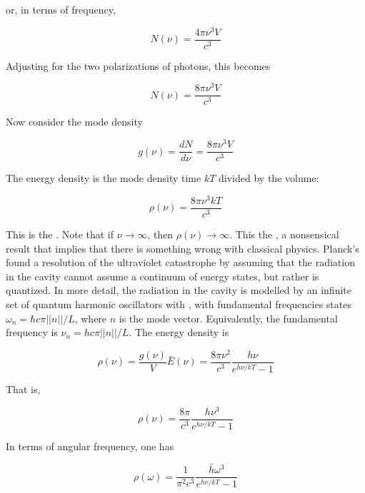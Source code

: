 or, in terms of frequency,

\begin{equation}
N(\nu) = \frac{4\pi\nu^3 V }{c^3}
\end{equation}


Adjusting for the two polarizations of photons, this becomes

\begin{equation}
N(\nu) = \frac{8\pi\nu^3 V }{c^3}
\end{equation}

Now consider the mode density

\begin{equation}
g(\nu) =\frac{ dN}{d\nu} =  \frac{8\pi\nu^3 V }{c^3}
\end{equation}

The energy density is the mode density time $kT$ divided by the volume:

\begin{equation}
\rho(\nu) = \frac{8\pi\nu^3 kT }{c^3}
\end{equation}


This is the .  Note that if $\nu \to \infty$, then
$\rho(\nu) \to \infty$.  This the , a nonsensical result that implies that there is something wrong with classical physics.  Planck's found a resolution of the ultraviolet catastrophe by assuming that the radiation in the cavity cannot assume a continuum of energy states, but rather is quantized.  In more detail, the radiation in the cavity is modelled by an infinite set of quantum harmonic oscillators with , with fundamental frequencies states $\omega_n = \hbar c\pi ||n||/L$, where $n$ is the mode vector.  Equivalently, the fundamental frequency is $\nu_n = h c\pi ||n||/L$.  The energy density is

\begin{equation}
\rho(\nu) = \frac{g(\nu)}{V}\bar E(\nu)
  = \frac{8\pi\nu^2 }{c^3} \frac{h\nu}{e^{h\nu/kT} - 1}
\end{equation}


That is,

\begin{equation}
\rho(\nu) = \frac{8\pi }{c^3} \frac{h\nu^3}{e^{h\nu/kT} - 1}
\end{equation}

In terms of angular frequency, one has

\begin{equation}
\rho(\omega) = \frac{1}{\pi^2 c^3} \frac{\bar h\omega^3}{e^{h\nu/kT} - 1}
\end{equation}

